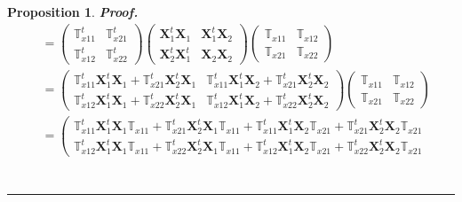 \documentclass[aps, preprint]{revtex4}
\newtheorem{proposition}[theorem]{Proposition}
\newenvironment{proof}[1][Proof]{\noindent\textbf{#1.} }{\ \rule{0.5em}{0.5em}}
\begin{document}
\begin{proposition}
\begin{proof}
\begin{align}
 &  =\left (\begin{array}{cc}\mathbb{T}_{x 1 1}^{t} & \mathbb{T}_{x 2 1}^{t} \\
\mathbb{T}_{x 1 2}^{t} & \mathbb{T}_{x 2 2}^{t}\end{array}\right ) \left (\begin{array}{cc}\mathbf{X}_{1}^{t} \mathbf{X}_{1} & \mathbf{X}_{1}^{t} \mathbf{X}_{2} \\
\mathbf{X}_{2}^{t} \mathbf{X}_{1}^{t} & \mathbf{X}_{2} \mathbf{X}_{2}\end{array}\right ) \left (\begin{array}{cc}\mathbb{T}_{x 1 1} & \mathbb{T}_{x 1 2} \\
\mathbb{T}_{x 2 1} & \mathbb{T}_{x 2 2}\end{array}\right ) \nonumber  \\
 &  =\left (\begin{array}{cc}\mathbb{T}_{x 1 1}^{t} \mathbf{X}_{1}^{t} \mathbf{X}_{1} +\mathbb{T}_{x 2 1}^{t} \mathbf{X}_{2}^{t} \mathbf{X}_{1} & \mathbb{T}_{x 1 1}^{t} \mathbf{X}_{1}^{t} \mathbf{X}_{2} +\mathbb{T}_{x 2 1}^{t} \mathbf{X}_{2}^{t} \mathbf{X}_{2} \\
\mathbb{T}_{x 1 2}^{t} \mathbf{X}_{1}^{t} \mathbf{X}_{1} +\mathbb{T}_{x 2 2}^{t} \mathbf{X}_{2}^{t} \mathbf{X}_{1} & \mathbb{T}_{x 1 2}^{t} \mathbf{X}_{1}^{t} \mathbf{X}_{2} +\mathbb{T}_{x 2 2}^{t} \mathbf{X}_{2}^{t} \mathbf{X}_{2}\end{array}\right ) \left (\begin{array}{cc}\mathbb{T}_{x 1 1} & \mathbb{T}_{x 1 2} \\
\mathbb{T}_{x 2 1} & \mathbb{T}_{x 2 2}\end{array}\right ) \\
 &  =\left (\begin{array}{c}\mathbb{T}_{x 1 1}^{t} \mathbf{X}_{1}^{t} \mathbf{X}_{1} \mathbb{T}_{x 1 1} +\mathbb{T}_{x 2 1}^{t} \mathbf{X}_{2}^{t} \mathbf{X}_{1} \mathbb{T}_{x 1 1} +\mathbb{T}_{x 1 1}^{t} \mathbf{X}_{1}^{t} \mathbf{X}_{2} \mathbb{T}_{x 2 1} +\mathbb{T}_{x 2 1}^{t} \mathbf{X}_{2}^{t} \mathbf{X}_{2} \mathbb{T}_{x 2 1} \\
\mathbb{T}_{x 1 2}^{t} \mathbf{X}_{1}^{t} \mathbf{X}_{1} \mathbb{T}_{x 1 1} +\mathbb{T}_{x 2 2}^{t} \mathbf{X}_{2}^{t} \mathbf{X}_{1} \mathbb{T}_{x 1 1} +\mathbb{T}_{x 1 2}^{t} \mathbf{X}_{1}^{t} \mathbf{X}_{2} \mathbb{T}_{x 2 1} +\mathbb{T}_{x 2 2}^{t} \mathbf{X}_{2}^{t} \mathbf{X}_{2} \mathbb{T}_{x 2 1}\end{array}\right . \\

\end{align}
\end{proof}
\end{proposition}
\end{document}
